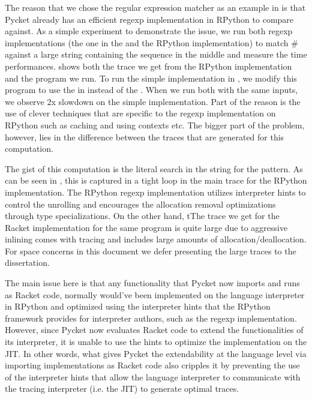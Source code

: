 The reason that we chose the regular expression matcher as an example
in  is that Pycket already has an efficient regexp
implementation in RPython to compare against. As a simple experiment
to demonstrate the issue, we run both regexp implementations (the one
in the  and the RPython implementation) to match
$\mathtt{\#}$ against a large string containing
the sequence  in the middle and measure the time
performances.  shows both the trace we get
from the RPython implementation and the program we run. To run the
simple implementation in , we modify this program
to use the  in instead of the
. When we run both with the same inputs, we
observe 2x slowdown on the simple implementation. Part of the reason
is the use of clever techniques that are specific to the regexp
implementation on RPython such as caching and using contexts etc. The
bigger part of the problem, however, lies in the difference between
the traces that are generated for this computation.

The gist of this computation is the literal search in the string for
the  pattern. As can be seen in
, this is captured in a tight loop in the
main trace for the RPython implementation. The RPython regexp
implementation utilizes interpreter hints to control the unrolling and
encourages the allocation removal optimizations through type
specializations. On the other hand, tThe trace we get for the Racket
implementation for the same program is quite large due to aggressive
inlining comes with tracing and includes large amounts of
allocation/deallocation. For space concerns in this document we defer
presenting the large traces to the dissertation.

The main issue here is that any functionality that Pycket now imports
and runs as Racket code, normally would've been implemented on the
language interpreter in RPython and optimized using the interpreter
hints that the RPython framework provides for interpreter authors,
such as the regexp implementation. However, since Pycket now evaluates
Racket code to extend the functionalities of its interpreter, it is
unable to use the hints to optimize the implementation on the JIT. In
other words, what gives Pycket the extendability at the language level
via importing implementations as Racket code also cripples it by
preventing the use of the interpreter hints that allow the language
interpreter to communicate with the tracing interpreter (i.e. the JIT)
to generate optimal traces.


